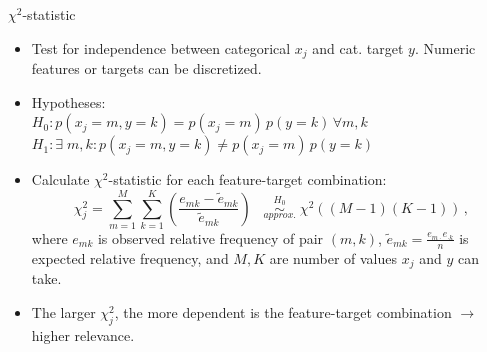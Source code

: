 \documentclass[11pt,compress,t,notes=noshow, xcolor=table]{beamer}
\begin{document}
  \begin{vbframe}{$\chi^2$-statistic}
  \begin{itemize}
    \item Test for independence between categorical $x_j$ and cat. target $y$. Numeric features or targets can be discretized.
    \item Hypotheses: \\
    $H_0: p(x_j = m, y = k) = p(x_j = m)\, p(y = k) \,\forall m, k$\\


    $H_1: \exists \; m, k: p(x_j = m, y = k) \neq p(x_j = m)\, p(y = k)$
    \item Calculate $\chi^2$-statistic for each feature-target combination:
      $$ \chi_j^2 = \sum_{m = 1}^{M} \sum_{k=1}^{K} (\frac{e_{mk} - \tilde{e}_{mk}}{\tilde{e}_{mk}}) \;\;\;   \stackrel{H_0}{\underset{approx.}{\sim}} \; \chi^2 ((M-1)(K-1))\,,$$
    where $e_{mk}$ is observed relative frequency of pair $(m,k)$, $\tilde{e}_{mk} = \frac{e_{m \cdot} e_{\cdot k}}{n}$ is expected relative frequency, and $M,K$ are number of values $x_j$ and $y$ can take.
    \item The larger $\chi_j^2$, the more dependent is the feature-target combination $\rightarrow$ higher relevance.
  \end{itemize}
  \end{vbframe}
\end{document}
